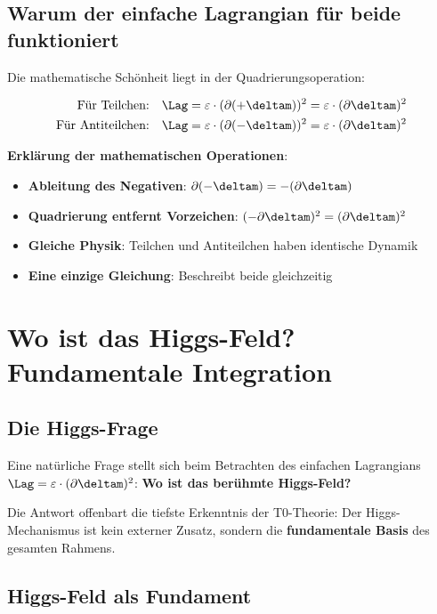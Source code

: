 	\subsection{Warum der einfache Lagrangian für beide funktioniert}
	
	Die mathematische Schönheit liegt in der Quadrierungsoperation:
	
	\begin{align}
		\text{Für Teilchen:} \quad \Lag &= \varepsilon \cdot (\partial (+\deltam))^2 = \varepsilon \cdot (\partial \deltam)^2 \\
		\text{Für Antiteilchen:} \quad \Lag &= \varepsilon \cdot (\partial (-\deltam))^2 = \varepsilon \cdot (\partial \deltam)^2
	\end{align}
	
	\textbf{Erklärung der mathematischen Operationen}:
	\begin{itemize}
		\item \textbf{Ableitung des Negativen}: $\partial(-\deltam) = -(\partial\deltam)$
		\item \textbf{Quadrierung entfernt Vorzeichen}: $(-\partial\deltam)^2 = (\partial\deltam)^2$
		\item \textbf{Gleiche Physik}: Teilchen und Antiteilchen haben identische Dynamik
		\item \textbf{Eine einzige Gleichung}: Beschreibt beide gleichzeitig
	\end{itemize}
	
	\section{Wo ist das Higgs-Feld? Fundamentale Integration}
	
	\subsection{Die Higgs-Frage}
	
	Eine natürliche Frage stellt sich beim Betrachten des einfachen Lagrangians $\Lag = \varepsilon \cdot (\partial \deltam)^2$: \textbf{Wo ist das berühmte Higgs-Feld?}
	
	Die Antwort offenbart die tiefste Erkenntnis der T0-Theorie: Der Higgs-Mechanismus ist kein externer Zusatz, sondern die \textbf{fundamentale Basis} des gesamten Rahmens.
	
	\subsection{Higgs-Feld als Fundament}
	
